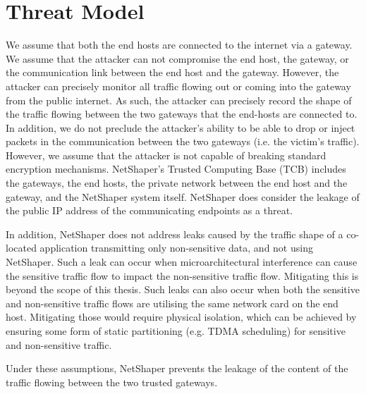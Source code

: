 \section{Threat Model}
\label{sec:netshaper-threat-model}

We assume that both the end hosts are connected to the internet via a gateway.
We assume that the attacker can not compromise the end host, the gateway, or the communication link between the end host and the gateway.
However, the attacker can precisely monitor all traffic flowing out or coming into the gateway from the public internet. 
As such, the attacker can precisely record the shape of the traffic flowing between the two gateways that the end-hosts are connected to.
In addition, we do not preclude the attacker's ability to be able to drop or inject packets in the communication between the two gateways (i.e. the victim's traffic).
However, we assume that the attacker is not capable of breaking standard encryption mechanisms.
NetShaper's Trusted Computing Base (TCB) includes the gateways, the end hosts, the private network between the end host and the gateway, and the NetShaper system itself.
NetShaper does consider the leakage of the public IP address of the communicating endpoints as a threat.

In addition, NetShaper does not address leaks caused by the traffic shape of a co-located application transmitting only non-sensitive data, and not using NetShaper.
Such a leak can occur when microarchitectural interference can cause the sensitive traffic flow to impact the non-sensitive traffic flow. Mitigating this is beyond the scope of this thesis.
Such leaks can also occur when both the sensitive and non-sensitive traffic flows are utilising the same network card on the end host.
Mitigating those would require physical isolation, which can be achieved by ensuring some form of static partitioning (e.g. TDMA scheduling) for sensitive and non-sensitive traffic.

Under these assumptions, NetShaper prevents the leakage of the content of the traffic flowing between the two trusted gateways.